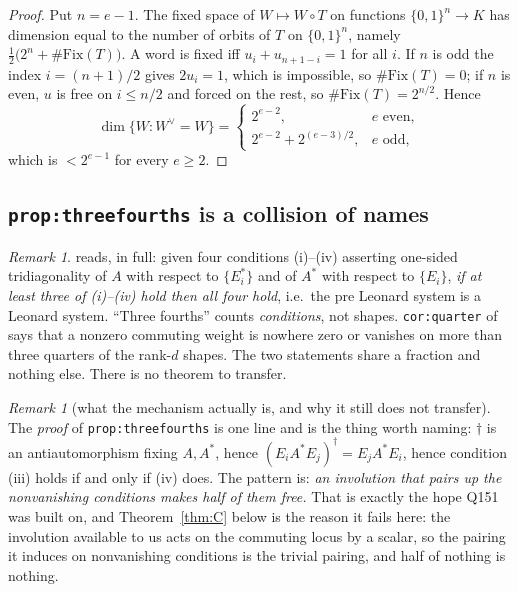 \documentclass[11pt]{article}
\theoremstyle{definition}
\theoremstyle{remark}
\newtheorem{remark}[theorem]{Remark}
\begin{document}
\begin{proof}
Put $n=e-1$.  The fixed space of $W\mapsto W\circ T$ on functions
$\{0,1\}^{n}\to K$ has dimension equal to the number of orbits of $T$ on $\{0,1\}^{n}$,
namely $\tfrac12\bigl(2^{n}+\#\mathrm{Fix}(T)\bigr)$.  A word is fixed iff
$u_i+u_{n+1-i}=1$ for all $i$.  If $n$ is odd the index $i=(n+1)/2$ gives $2u_i=1$, which
is impossible, so $\#\mathrm{Fix}(T)=0$; if $n$ is even, $u$ is free on
$i\le n/2$ and forced on the rest, so $\#\mathrm{Fix}(T)=2^{n/2}$.  Hence
\[
   \dim\{W:W^\vee=W\}=\begin{cases}2^{e-2}, & e \text{ even},\\[2pt]
   2^{e-2}+2^{(e-3)/2}, & e \text{ odd},\end{cases}
\]
which is $<2^{e-1}$ for every $e\ge2$.
\end{proof}

\subsection{\texttt{prop:threefourths} is a collision of names}

\begin{remark}\label{rem:collision}
\cite[\texttt{prop:threefourths}]{T2020} reads, in full: given four conditions (i)--(iv)
asserting one-sided tridiagonality of $A$ with respect to $\{E^*_i\}$ and of $A^*$ with
respect to $\{E_i\}$, \emph{if at least three of \textrm{(i)--(iv)} hold then all four
hold}, i.e.\ the pre Leonard system is a Leonard system.  ``Three fourths'' counts
\emph{conditions}, not shapes.  \texttt{cor:quarter} of \cite{Q150c2} says that a nonzero
commuting weight is nowhere zero or vanishes on more than three quarters of the rank-$d$
shapes.  The two statements share a fraction and nothing else.  There is no theorem to
transfer.
\end{remark}

\begin{remark}[what the mechanism actually is, and why it still does not transfer]
\label{rem:mechanism}
The \emph{proof} of \texttt{prop:threefourths} is one line and is the thing worth naming:
$\dagger$ is an antiautomorphism fixing $A,A^*$, hence $(E_iA^*E_j)^\dagger=E_jA^*E_i$,
hence condition (iii) holds if and only if (iv) does.  The pattern is: \emph{an involution
that pairs up the nonvanishing conditions makes half of them free.}  That is exactly the
hope Q151 was built on, and Theorem~\ref{thm:C} below is the reason it fails here: the
involution available to us acts on the commuting locus by a scalar, so the pairing it
induces on nonvanishing conditions is the trivial pairing, and half of nothing is nothing.
\end{remark}
\end{document}
